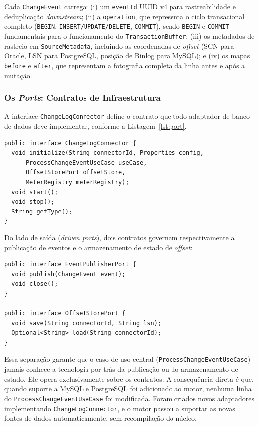 \documentclass[12pt]{article}
\begin{document}
Cada \texttt{ChangeEvent} carrega: (i) um \texttt{eventId} UUID v4 para
rastreabilidade e deduplicação \textit{downstream}; (ii) a
\texttt{operation}, que representa o ciclo transacional completo
(\texttt{BEGIN}, \texttt{INSERT/UPDATE/DELETE}, \texttt{COMMIT}), sendo
\texttt{BEGIN} e \texttt{COMMIT} fundamentais para o funcionamento do
\texttt{TransactionBuffer}; (iii) os metadados de rastreio em
\texttt{SourceMetadata}, incluindo as coordenadas de \textit{offset}
(SCN para Oracle, LSN para PostgreSQL, posição de Binlog para MySQL); e
(iv) os mapas \texttt{before} e \texttt{after}, que representam a fotografia
completa da linha antes e após a mutação.

\subsubsection{Os \textit{Ports}: Contratos de Infraestrutura}

A interface \texttt{ChangeLogConnector} define o contrato que todo adaptador
de banco de dados deve implementar, conforme a Listagem~\ref{lst:port}.

\begin{lstlisting}[style=javastyle,
  caption={Interface \texttt{ChangeLogConnector}, \textit{port} de entrada.},
  label={lst:port}]
public interface ChangeLogConnector {
  void initialize(String connectorId, Properties config,
      ProcessChangeEventUseCase useCase,
      OffsetStorePort offsetStore,
      MeterRegistry meterRegistry);
  void start();
  void stop();
  String getType();
}
\end{lstlisting}

Do lado de saída (\textit{driven ports}), dois contratos governam
respectivamente a publicação de eventos e o armazenamento de estado de
\textit{offset}:

\begin{lstlisting}[style=javastyle,
  caption={\textit{Ports} de saída: publicação de eventos e armazenamento de \textit{offset}.},
  label={lst:outports}]
public interface EventPublisherPort {
  void publish(ChangeEvent event);
  void close();
}

public interface OffsetStorePort {
  void save(String connectorId, String lsn);
  Optional<String> load(String connectorId);
}
\end{lstlisting}

Essa separação garante que o caso de uso central
(\texttt{ProcessChangeEventUseCase}) jamais conhece a tecnologia por trás
da publicação ou do armazenamento de estado. Ele opera exclusivamente sobre
os contratos. A consequência direta é que, quando suporte a MySQL e
PostgreSQL foi adicionado ao motor, nenhuma linha do
\texttt{ProcessChangeEventUseCase} foi modificada. Foram criados novos
adaptadores implementando \texttt{ChangeLogConnector}, e o motor passou a
suportar as novas fontes de dados automaticamente, sem recompilação do
núcleo.
\end{document}
